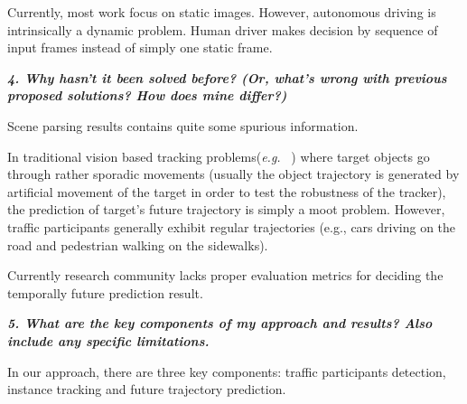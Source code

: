 \documentclass[10pt,twocolumn,letterpaper]{article}
\begin{document}
Currently, most work focus on static images. However, autonomous driving is intrinsically a dynamic problem. Human driver makes decision by sequence of input frames instead of simply one static frame.

\textbf{\emph{4. Why hasn't it been solved before? (Or, what's wrong with previous proposed solutions? How does mine differ?)}}

Scene parsing results contains quite some spurious information.

In traditional vision based tracking problems(\emph{e.g.} ~\cite{wu2013online, wu2015object, mueller2016benchmark}) where target objects go through rather sporadic movements (usually the object trajectory is generated by artificial movement of the target in order to test the robustness of the tracker), the prediction of target's future trajectory is simply a moot problem.
However, traffic participants generally exhibit regular trajectories (e.g., cars driving on the road and pedestrian walking on the sidewalks).

Currently research community lacks proper evaluation metrics for deciding the temporally future prediction result.



\textbf{\emph{5. What are the key components of my approach and results? Also include any specific limitations.}}

In our approach, there are three key components: traffic participants detection, instance tracking and future trajectory prediction.

\end{document}
